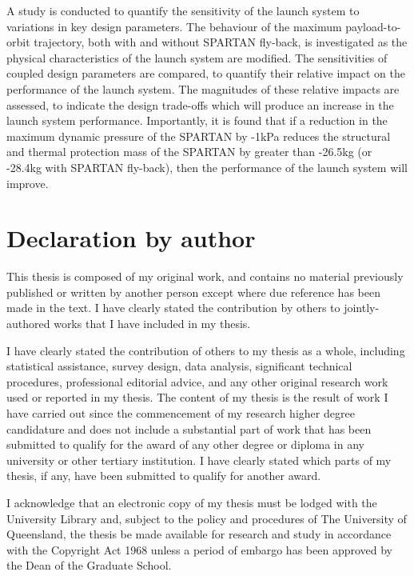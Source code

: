 A study is conducted to quantify the sensitivity of the launch system to variations in key design parameters. The behaviour of the maximum payload-to-orbit trajectory, both with and without SPARTAN fly-back, is investigated as the physical characteristics of the launch system are modified. 
The sensitivities of coupled design parameters are compared, to quantify their relative impact on the performance of the launch system. The magnitudes of these relative impacts are assessed, to indicate the design trade-offs which will produce an increase in the launch system performance. Importantly, it is found that if a reduction in the maximum dynamic pressure of the SPARTAN by -1kPa reduces the structural and thermal protection mass of the SPARTAN by greater than -26.5kg (or -28.4kg with SPARTAN fly-back), then the performance of the launch system will improve. 

 

\clearpage
\section*{Declaration by author}

  This thesis is composed of my original work, and contains no material previously published or written by another person except where due reference has been made in the text. I have clearly stated the contribution by others to jointly-authored works that I have included in my thesis.

  I have clearly stated the contribution of others to my thesis as a whole, including statistical assistance, survey design, data analysis, significant technical procedures, professional editorial advice, and any other original research work used or reported in my thesis. The content of my thesis is the result of work I have carried out since the commencement of my research higher degree candidature and does not include a substantial part of work that has been submitted to qualify for the award of any other degree or diploma in any university or other tertiary institution. I have clearly stated which parts of my thesis, if any, have been submitted to qualify for another award.

  I acknowledge that an electronic copy of my thesis must be lodged with the University Library and, subject to the policy and procedures of The University of Queensland, the thesis be made available for research and study in accordance with the Copyright Act 1968 unless a period of embargo has been approved by the Dean of the Graduate School.


